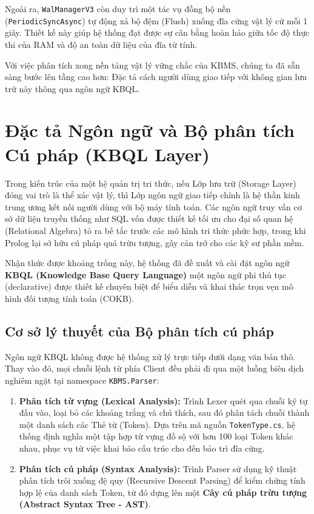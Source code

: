 \documentclass[13pt,a4paper,oneside]{extreport}
\begin{document}
Ngoài ra, \texttt{WalManagerV3} còn duy trì một tác vụ đồng bộ nền (\texttt{PeriodicSyncAsync}) tự động xả bộ đệm (Flush) xuống đĩa cứng vật lý cứ mỗi 1 giây. Thiết kế này giúp hệ thống đạt được sự cân bằng hoàn hảo giữa tốc độ thực thi của RAM và độ an toàn dữ liệu của đĩa từ tính.


Với việc phân tích xong nền tảng vật lý vững chắc của KBMS, chúng ta đã sẵn sàng bước lên tầng cao hơn: Đặc tả cách người dùng giao tiếp với không gian lưu trữ này thông qua ngôn ngữ KBQL.


\section{Đặc tả Ngôn ngữ và Bộ phân tích Cú pháp (KBQL Layer)}


Trong kiến trúc của một hệ quản trị tri thức, nếu Lớp lưu trữ (Storage Layer) đóng vai trò là thể xác vật lý, thì Lớp ngôn ngữ giao tiếp chính là hệ thần kinh trung ương kết nối người dùng với bộ máy tính toán. Các ngôn ngữ truy vấn cơ sở dữ liệu truyền thống như SQL vốn được thiết kế tối ưu cho đại số quan hệ (Relational Algebra) tỏ ra bế tắc trước các mô hình tri thức phức hợp, trong khi Prolog lại sở hữu cú pháp quá trừu tượng, gây cản trở cho các kỹ sư phần mềm.


Nhận thức được khoảng trống này, hệ thống đã đề xuất và cài đặt ngôn ngữ \textbf{KBQL (Knowledge Base Query Language)}  một ngôn ngữ phi thủ tục (declarative) được thiết kế chuyên biệt để biểu diễn và khai thác trọn vẹn mô hình đối tượng tính toán (COKB).


\subsection{Cơ sở lý thuyết của Bộ phân tích cú pháp}


Ngôn ngữ KBQL không được hệ thống xử lý trực tiếp dưới dạng văn bản thô. Thay vào đó, mọi chuỗi lệnh từ phía Client đều phải đi qua một luồng biên dịch nghiêm ngặt tại namespace \texttt{KBMS.\allowbreak{}Parser}:


\begin{enumerate}
  \item \textbf{Phân tích từ vựng (Lexical Analysis):} Trình Lexer quét qua chuỗi ký tự đầu vào, loại bỏ các khoảng trắng và chú thích, sau đó phân tách chuỗi thành một danh sách các Thẻ từ (Token). Dựa trên mã nguồn \texttt{TokenType.\allowbreak{}cs}, hệ thống định nghĩa một tập hợp từ vựng đồ sộ với hơn 100 loại Token khác nhau, phục vụ từ việc khai báo cấu trúc cho đến bảo trì đĩa cứng.
  \item \textbf{Phân tích cú pháp (Syntax Analysis):} Trình Parser sử dụng kỹ thuật phân tích trôi xuống đệ quy (Recursive Descent Parsing) để kiểm chứng tính hợp lệ của danh sách Token, từ đó dựng lên một \textbf{Cây cú pháp trừu tượng (Abstract Syntax Tree - AST)}.
\end{enumerate}
\end{document}
